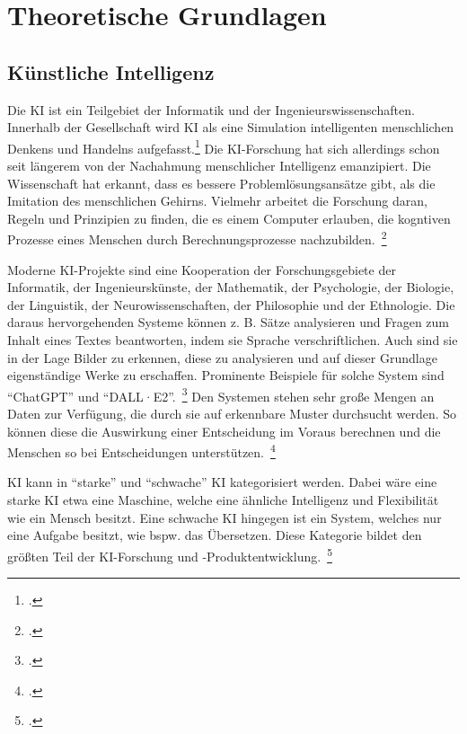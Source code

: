\newpage
\section{Theoretische Grundlagen} \label{grundlange}

\subsection{Künstliche Intelligenz}

Die \ac{KI} ist ein Teilgebiet der Informatik und der Ingenieurswissenschaften. Innerhalb der Gesellschaft wird \ac{KI} als eine Simulation intelligenten 
menschlichen Denkens und Handelns aufgefasst.\footcite[][]{Mainzer.2019} 
Die KI-Forschung hat sich allerdings schon seit längerem von der Nachahmung menschlicher Intelligenz emanzipiert. 
Die Wissenschaft hat erkannt, dass es bessere Problemlösungsansätze gibt, als die Imitation des menschlichen Gehirns.
Vielmehr arbeitet die Forschung daran, Regeln und Prinzipien zu finden, die es einem Computer erlauben, die kogntiven Prozesse eines Menschen durch Berechnungsprozesse 
nachzubilden.~\footcite[\vglf][]{Lenzen.2020}

Moderne KI-Projekte sind eine Kooperation der Forschungsgebiete der Informatik, der Ingenieurskünste, der Mathematik, der Psychologie, der Biologie, der Linguistik,
der Neurowissenschaften, der Philosophie und der Ethnologie.
Die daraus hervorgehenden Systeme können z. B. Sätze analysieren und Fragen zum Inhalt eines Textes beantworten, indem sie Sprache verschriftlichen.
Auch sind sie in der Lage Bilder zu erkennen, diese zu analysieren und auf dieser Grundlage eigenständige Werke zu erschaffen.
Prominente Beispiele für solche System sind \enquote{ChatGPT} und \enquote{DALL·E2}.~\footcite[\vglf][]{Lenzen.2020}
Den Systemen stehen sehr große Mengen an Daten zur Verfügung, die durch sie auf erkennbare Muster durchsucht werden. So können diese die Auswirkung einer Entscheidung im Voraus 
berechnen und die Menschen so bei Entscheidungen unterstützen.~\footcite[\vglf][]{Lenzen.2020}

\ac{KI} kann in \enquote{starke} und \enquote{schwache} \ac{KI} kategorisiert werden. Dabei wäre eine starke \ac{KI} etwa eine Maschine,
welche eine ähnliche Intelligenz und Flexibilität wie ein Mensch besitzt. Eine schwache \ac{KI} hingegen ist ein System, welches nur eine Aufgabe besitzt, wie bspw. das Übersetzen.
Diese Kategorie bildet den größten Teil der KI-Forschung und -Produktentwicklung.~\footcite[\vglf][]{Lenzen.2020}

